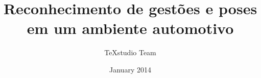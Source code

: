 \documentclass[a4paper,12pt]{book}
\begin{document}
\author{TeXstudio Team}
\title{Reconhecimento de gestões e poses em um ambiente automotivo}
\date{January 2014}

\frontmatter
\maketitle
\tableofcontents

\mainmatter



\backmatter
\end{document}
